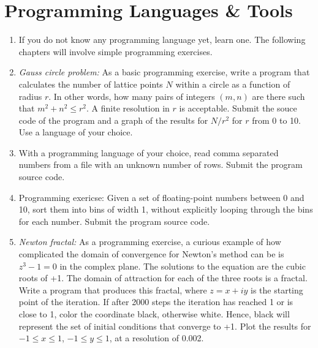 \documentclass{article}
\begin{document}
\newpage
\section{Programming Languages \& Tools}

\begin{enumerate}

\item If you do not know any programming language yet, learn one. The following chapters will involve simple programming exercises. 

  
\item {\it Gauss circle problem:}
  As a basic programming exercise, write a program that calculates the number of lattice points $N$ within a circle as a function of radius $r$.
In other words, how many pairs of integers $(m,n)$ are there such that $m^2+n^2 \leq  r^2$.
A finite resolution in $r$ is acceptable. Submit the souce code of the program and a graph of the results for $N/r^2$ for $r$ from 0 to 10.
Use a language of your choice.

\item 
With a programming language of your choice, read comma separated numbers from a file with an unknown number of rows.
Submit the program source code.


\item
Programming exericse: Given a set of floating-point numbers between 0 and 10, sort them into bins of width 1, without explicitly looping through the bins for each number. Submit the program source code.


\item {\it Newton fractal:}  \label{exrc:fractal}
As a programming exercise, a curious example of how complicated the domain of convergence for Newton's method can be is $z^3-1=0$ in the complex plane.  The solutions to the equation are the cubic roots of +1.  The domain of attraction for each of the three roots is a fractal. Write a program that produces this fractal, where $z=x+iy$ is the starting point of the iteration. If after 2000 steps the iteration has reached 1 or is close to 1, color the coordinate black, otherwise white. Hence, black will represent the set of initial conditions that converge to +1. Plot the results for $-1\leq x \leq 1$, $-1\leq y \leq1$, at a resolution of 0.002.


\end{enumerate}
\end{document}
